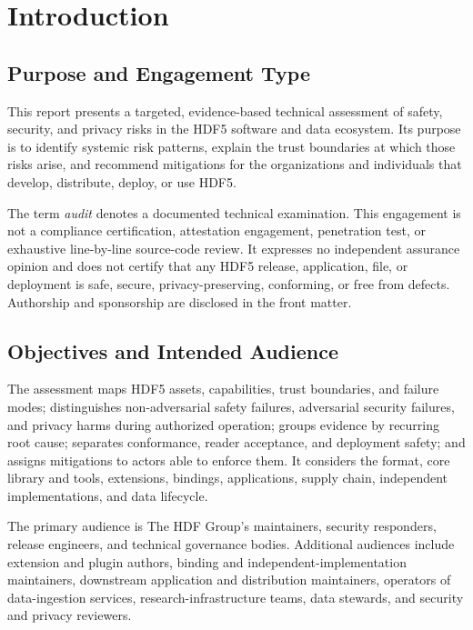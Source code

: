 \documentclass[../main.tex]{subfiles}
\begin{document}
\section{Introduction}
\label{sec:intro}

\subsection{Purpose and Engagement Type}
\label{sec:engagement-purpose}

This report presents a targeted, evidence-based technical assessment of
safety, security, and privacy risks in the HDF5 software and data ecosystem.
Its purpose is to identify systemic risk patterns, explain the trust boundaries
at which those risks arise, and recommend mitigations for the organizations and
individuals that develop, distribute, deploy, or use HDF5.

The term \emph{audit} denotes a documented technical examination. This
engagement is not a compliance certification, attestation engagement,
penetration test, or exhaustive line-by-line source-code review. It expresses
no independent assurance opinion and does not certify that any HDF5 release,
application, file, or deployment is safe, secure, privacy-preserving,
conforming, or free from defects. Authorship and sponsorship are disclosed in
the front matter.

\subsection{Objectives and Intended Audience}
\label{sec:engagement-objectives}

The assessment maps HDF5 assets, capabilities, trust boundaries, and failure
modes; distinguishes non-adversarial safety failures, adversarial security
failures, and privacy harms during authorized operation; groups evidence by
recurring root cause; separates conformance, reader acceptance, and deployment
safety; and assigns mitigations to actors able to enforce them. It considers
the format, core library and tools, extensions, bindings, applications, supply
chain, independent implementations, and data lifecycle.

The primary audience is The HDF Group's maintainers, security responders,
release engineers, and technical governance bodies. Additional audiences
include extension and plugin authors, binding and independent-implementation
maintainers, downstream application and distribution maintainers, operators of
data-ingestion services, research-infrastructure teams, data stewards, and
security and privacy reviewers.
\end{document}
